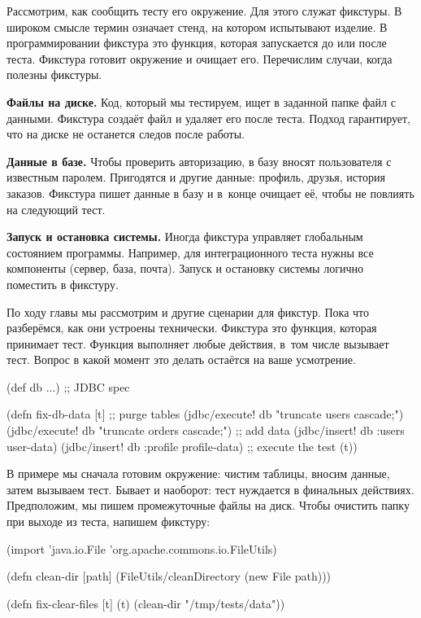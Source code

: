 Рассмотрим, как сообщить тесту его окружение. Для этого служат фикстуры. В
широком смысле термин означает стенд, на котором испытывают изделие. В
программировании фикстура это функция, которая запускается до или после
теста. Фикстура готовит окружение и очищает его. Перечислим случаи, когда
полезны фикстуры.


\textbf{Файлы на диске.} Код, который мы тестируем, ищет в заданной папке файл с
данными. Фикстура создаёт файл и удаляет его после теста. Подход гарантирует,
что на диске не останется следов после работы.

\textbf{Данные в базе.} Чтобы проверить авторизацию, в базу вносят пользователя
с известным паролем. Пригодятся и другие данные: профиль, друзья, история
заказов. Фикстура пишет данные в базу и в~конце очищает её, чтобы не повлиять на
следующий тест.

\textbf{Запуск и остановка системы.} Иногда фикстура управляет глобальным
состоянием программы. Например, для интеграционного теста нужны все компоненты
(сервер, база, почта). Запуск и остановку системы логично поместить в фикстуру.

По ходу главы мы рассмотрим и другие сценарии для фикстур. Пока что разберёмся,
как они устроены технически. Фикстура это функция, которая принимает
тест. Функция выполняет любые действия, в~том числе вызывает тест. Вопрос в
какой момент это делать остаётся на ваше усмотрение.


\begin{english}
  \begin{clojure}
(def db {...}) ;; JDBC spec

(defn fix-db-data [t]
  ;; purge tables
  (jdbc/execute! db "truncate users cascade;")
  (jdbc/execute! db "truncate orders cascade;")
  ;; add data
  (jdbc/insert! db :users user-data)
  (jdbc/insert! db :profile profile-data)
  ;; execute the test
  (t))
  \end{clojure}
\end{english}

В примере мы сначала готовим окружение: чистим таблицы, вносим данные, затем
вызываем тест. Бывает и наоборот: тест нуждается в финальных
действиях. Предположим, мы пишем промежуточные файлы на диск. Чтобы очистить
папку при выходе из теста, напишем фикстуру:


\begin{english}
  \begin{clojure}
(import 'java.io.File
        'org.apache.commons.io.FileUtils)

(defn clean-dir [path]
  (FileUtils/cleanDirectory (new File path)))

(defn fix-clear-files [t]
  (t)
  (clean-dir "/tmp/tests/data"))
  \end{clojure}
\end{english}

